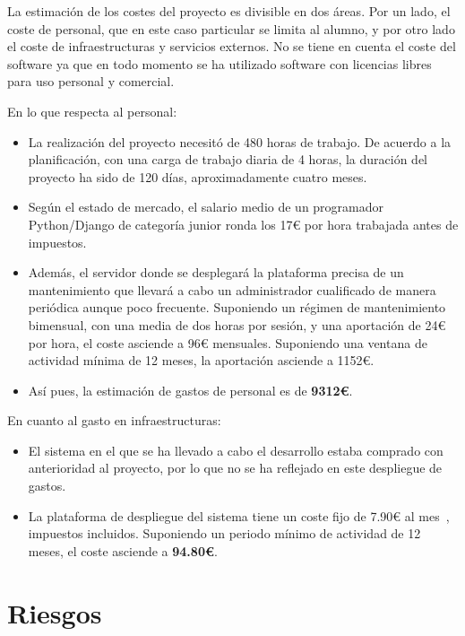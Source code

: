 La estimación de los costes del proyecto es divisible en dos áreas. Por un lado,
el coste de personal, que en este caso particular se limita al alumno, y por
otro lado el coste de infraestructuras y servicios externos. No se tiene en
cuenta el coste del software ya que en todo momento se ha utilizado software con
licencias libres para uso personal y comercial.

En lo que respecta al personal:

\begin{itemize}
\item La realización del proyecto necesitó de 480 horas de trabajo. De acuerdo a
  la planificación, con una carga de trabajo diaria de 4 horas, la duración del
  proyecto ha sido de 120 días, aproximadamente cuatro meses.
\item Según el estado de mercado, el salario medio de un programador
  Python/Django de categoría junior ronda los 17€ por hora trabajada antes de
  impuestos.
\item Además, el servidor donde se desplegará la plataforma precisa de un
  mantenimiento que llevará a cabo un administrador cualificado de manera
  periódica aunque poco frecuente. Suponiendo un régimen de mantenimiento
  bimensual, con una media de dos horas por sesión, y una aportación de 24€ por
  hora, el coste asciende a 96€ mensuales. Suponiendo una ventana de actividad
  mínima de 12 meses, la aportación asciende a 1152€.
\item Así pues, la estimación de gastos de personal es de \textbf{9312€}.
\end{itemize}

En cuanto al gasto en infraestructuras:

\begin{itemize}
\item El sistema en el que se ha llevado a cabo el desarrollo estaba comprado
  con anterioridad al proyecto, por lo que no se ha reflejado en este despliegue
  de gastos.

\item La plataforma de despliegue del sistema tiene un coste fijo de 7.90€ al
  mes~\cite{hetznervq7}, impuestos incluidos. Suponiendo un periodo mínimo de
  actividad de 12 meses, el coste asciende a \textbf{94.80€}.
\end{itemize}

\section{Riesgos}
\label{sec:riesgos}


